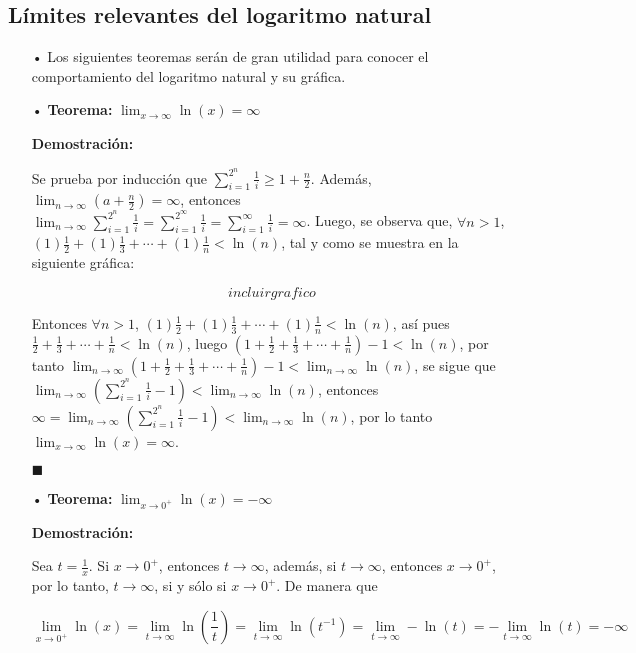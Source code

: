 \documentclass[pts12]{article}
\numberwithin{equation}{section}
\newcommand{\Col}{\color{ProcessBlue}}
\begin{document}
\subsection{\Col Límites relevantes del logaritmo natural}

\begin{itemize}

\item[\Col •] Los siguientes teoremas serán de gran utilidad para conocer el comportamiento del logaritmo natural y su gráfica.

\item[\Col •] \textbf{Teorema:} $\lim_{x\to \infty}\ln(x)=\infty$

\textbf{Demostración:}

Se prueba por inducción que $\sum_{i=1}^{2^n}\frac{1}{i}\geq 1+\frac{n}{2}$. Además, $\lim_{n\to \infty}\left(a+\frac{n}{2}\right)=\infty$, entonces $\lim_{n\to \infty}\sum_{i=1}^{2^n}\frac{1}{i}=\sum_{i=1}^{2^\infty}\frac{1}{i}=\sum_{i=1}^{\infty}\frac{1}{i}=\infty$. Luego, se observa que, $\forall n>1$, $(1)\frac{1}{2}+(1)\frac{1}{3}+\cdots+(1)\frac{1}{n}<\ln(n)$, tal y como se muestra en la siguiente gráfica:

$$ incluirgrafico $$  

Entonces $\forall n>1$, $(1)\frac{1}{2}+(1)\frac{1}{3}+\cdots+(1)\frac{1}{n}<\ln(n)$, así pues $\frac{1}{2}+\frac{1}{3}+\cdots+\frac{1}{n}<\ln(n)$, luego $\left(1+\frac{1}{2}+\frac{1}{3}+\cdots+\frac{1}{n}\right)-1<\ln(n)$, por tanto $\lim_{n\to \infty}\left(1+\frac{1}{2}+\frac{1}{3}+\cdots+\frac{1}{n}\right)-1 <\lim_{n\to\infty}\ln(n)$, se sigue que $\lim_{n\to \infty}\left(\sum_{i=1}^{2^n}\frac{1}{i}-1\right)<\lim_{n\to\infty}\ln(n)$, entonces $\infty=\lim_{n\to \infty}\left(\sum_{i=1}^{2^n}\frac{1}{i}-1\right)<\lim_{n\to\infty}\ln(n)$, por lo tanto $\lim_{x\to\infty}\ln(x)=\infty$.

\begin{flushright}
$\blacksquare$
\end{flushright}

\item[\Col •] \textbf{Teorema:} $\lim_{x\to 0^+}\ln(x)=-\infty$

\textbf{Demostración:}

Sea $t=\frac{1}{x}$. Si $x\to 0^+$, entonces $t\to\infty$, además, si $t\to\infty$, entonces $x\to 0^+$, por lo tanto, $t\to\infty$, si y sólo si $x\to 0^+$. De manera que

$$\lim_{x\to 0^+}\ln(x)=\lim_{t\to\infty}\ln\left(\frac{1}{t}\right)=\lim_{t\to\infty}\ln(t^{-1})=\lim_{t\to\infty}-\ln(t)=-\lim_{t\to\infty}\ln(t)=-\infty$$


\end{itemize}
\end{document}
